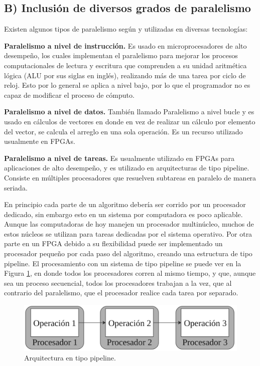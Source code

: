 \documentclass[twoside,spanish,ESP,MSc]{plantillaLabUPV}
\theoremstyle{definition}
\begin{document}
\subsection*{B) Inclusión de diversos grados de paralelismo}

Existen algunos tipos de paralelismo según \cite{paralel} y \cite{paralel2} utilizadas en diversas tecnologías:

\checkmark\textbf{Paralelismo a nivel de instrucción.} Es usado en microprocesadores de alto desempeño, los cuales implementan el paralelismo para mejorar los procesos computacionales de lectura y escritura que comprenden a su unidad aritmética lógica (ALU por sus siglas en inglés), realizando más de una tarea por ciclo de reloj. Esto por lo general se aplica a nivel bajo, por lo que el programador no es capaz de modificar el proceso de cómputo.

\checkmark\textbf{Paralelismo a nivel de datos.} También llamado Paralelismo a nivel bucle y es usado en cálculos de vectores en donde en vez de realizar un cálculo por elemento del vector, se calcula el arreglo en una sola operación. Es un recurso utilizado usualmente en FPGAs.

\checkmark\textbf{Paralelismo a nivel de tareas.} Es usualmente utilizado en FPGAs para aplicaciones de alto desempeño, y es utilizado en arquitecturas de tipo pipeline. Consiste en múltiples procesadores que resuelven subtareas en paralelo de manera seriada.

En principio cada parte de un algoritmo debería ser corrido por un procesador dedicado, sin embargo esto en un sistema por computadora es poco aplicable. Aunque las computadoras de hoy manejen un procesador multinúcleo, muchos de estos núcleos se utilizan para tareas dedicadas por el sistema operativo. Por otra parte en un FPGA debido a su flexibilidad puede ser implementado un procesador pequeño por cada paso del algoritmo, creando una estructura de tipo pipeline. El procesamiento con un sistema de tipo pipeline se puede ver en la Figura \ref{pipe}, en donde todos los procesadores corren al mismo tiempo, y que, aunque sea un proceso secuencial, todos los procesadores trabajan a la vez, que al contrario del paralelismo, que el procesador realice cada tarea por separado.

 
\begin{figure}[!tbh]
	\centering
	\includegraphics[scale=0.4]{edrawimas/pipe}
	\caption{Arquitectura en tipo pipeline. 
		\label{pipe}}
\end{figure}
\end{document}
